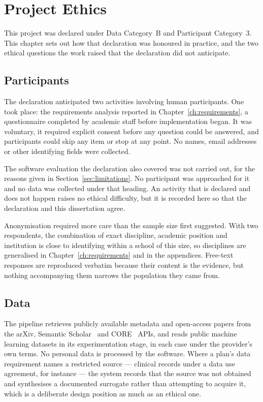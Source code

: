 \chapter{Project Ethics}
\label{ch:ethics}


This project was declared under Data Category~B and Participant Category~3. This chapter sets
out how that declaration was honoured in practice, and the two ethical questions the work
raised that the declaration did not anticipate.

\section{Participants}

The declaration anticipated two activities involving human participants. One took place: the
requirements analysis reported in Chapter~\ref{ch:requirements}, a questionnaire completed by
academic staff before implementation began. It was voluntary, it required explicit consent
before any question could be answered, and participants could skip any item or stop at any
point. No names, email addresses or other identifying fields were collected.

The software evaluation the declaration also covered was not carried out, for the reasons
given in Section~\ref{sec:limitations}. No participant was approached for it and no data was
collected under that heading. An activity that is declared and does not happen raises no
ethical difficulty, but it is recorded here so that the declaration and this dissertation
agree.

Anonymisation required more care than the sample size first suggested. With two respondents,
the combination of exact discipline, academic position and institution is close to
identifying within a school of this size, so disciplines are generalised in
Chapter~\ref{ch:requirements} and in the appendices. Free-text responses are reproduced
verbatim because their content is the evidence, but nothing accompanying them narrows the
population they came from.

\section{Data}

The pipeline retrieves publicly available metadata and open-access papers from the arXiv,
Semantic Scholar~\cite{semanticscholar} and CORE~\cite{corapi} APIs, and reads public machine
learning datasets in its experimentation stage, in each case under the provider's own terms.
No personal data is processed by the software. Where a plan's data requirement names a
restricted source --- clinical records under a data use agreement, for instance --- the system
records that the source was not obtained and synthesises a documented surrogate rather than
attempting to acquire it, which is a deliberate design position as much as an ethical one.

